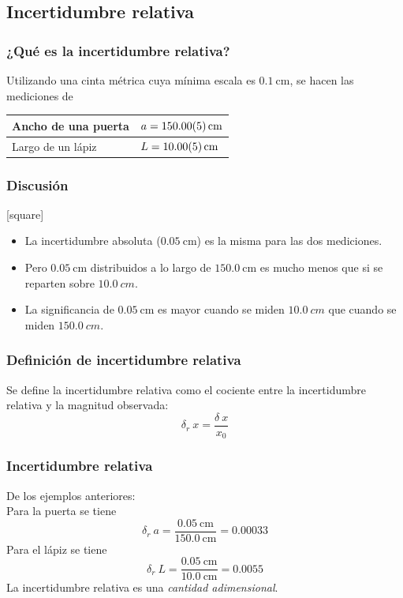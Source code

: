 \subsection{Incertidumbre relativa}
\begin{frame}
\frametitle{¿Qué es la incertidumbre relativa?}
Utilizando una cinta métrica cuya mínima escala es $\SI{0.1}{\cm}$, se hacen las mediciones de
\\
\bigskip
\begin{tabular}{l | l}
\hline
Ancho de una puerta & $a=\SI{150.0+-0.05}{\cm}$ \\ \hline
Largo de un lápiz & $L=\SI{10.0+-0.05}{\cm}$ \\ \hline
\end{tabular}
\end{frame}
\begin{frame}
\frametitle{Discusión}
[square]
\begin{itemize}[<+->]
\item La incertidumbre absoluta ($\SI{0.05}{\cm}$) es la misma para las dos mediciones.
\item Pero $\SI{0.05}{\cm}$ distribuidos a lo largo de $\SI{150.0}{\cm}$ es mucho menos que si se reparten sobre $\SI{10.0}{cm}$.
\item La significancia de $\SI{0.05}{\cm}$ es mayor cuando se miden $\SI{10.0}{cm}$ que cuando se miden $\SI{150.0}{cm}$.
\end{itemize}
\end{frame}
\begin{frame}
\frametitle{Definición de incertidumbre relativa}
Se define la incertidumbre relativa como el cociente entre la incertidumbre relativa y la magnitud observada:
\[ \delta_{r} \: x = \dfrac{\delta \: x}{x_{0}} \]
\end{frame}
\begin{frame}
\frametitle{Incertidumbre relativa}
De los ejemplos anteriores:
\\
\bigskip
Para la puerta se tiene
\[ \delta_{r} \: a = \dfrac{\SI{0.05}{\cm}}{\SI{150.0}{\cm}} = 0.00033 \]
Para el lápiz se tiene
\[ \delta_{r} \: L = \dfrac{\SI{0.05}{\cm}}{\SI{10.0}{\cm}} = 0.0055 \]
La incertidumbre relativa es una \emph{cantidad adimensional}.
\end{frame}
